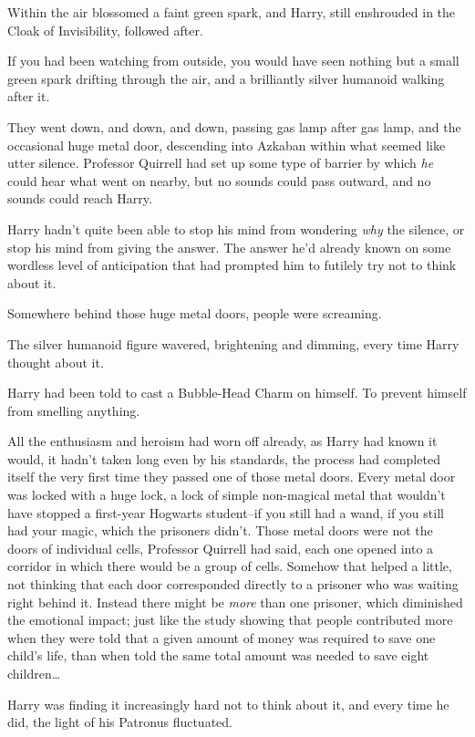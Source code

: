 Within the air blossomed a faint green spark, and Harry, still enshrouded in the Cloak of Invisibility, followed after.

If you had been watching from outside, you would have seen nothing but a small green spark drifting through the air, and a brilliantly silver humanoid walking after it.

\later

They went down, and down, and down, passing gas lamp after gas lamp, and the occasional huge metal door, descending into Azkaban within what seemed like utter silence. Professor Quirrell had set up some type of barrier by which \emph{he} could hear what went on nearby, but no sounds could pass outward, and no sounds could reach Harry.

Harry hadn't quite been able to stop his mind from wondering \emph{why} the silence, or stop his mind from giving the answer. The answer he'd already known on some wordless level of anticipation that had prompted him to futilely try not to think about it.

Somewhere behind those huge metal doors, people were screaming.

The silver humanoid figure wavered, brightening and dimming, every time Harry thought about it.

Harry had been told to cast a Bubble-Head Charm on himself. To prevent himself from smelling anything.

All the enthusiasm and heroism had worn off already, as Harry had known it would, it hadn't taken long even by his standards, the process had completed itself the very first time they passed one of those metal doors. Every metal door was locked with a huge lock, a lock of simple non-magical metal that wouldn't have stopped a first-year Hogwarts student\---if you still had a wand, if you still had your magic, which the prisoners didn't. Those metal doors were not the doors of individual cells, Professor Quirrell had said, each one opened into a corridor in which there would be a group of cells. Somehow that helped a little, not thinking that each door corresponded directly to a prisoner who was waiting right behind it. Instead there might be \emph{more} than one prisoner, which diminished the emotional impact; just like the study showing that people contributed more when they were told that a given amount of money was required to save one child's life, than when told the same total amount was needed to save eight children{\ldots}

Harry was finding it increasingly hard not to think about it, and every time he did, the light of his Patronus fluctuated.

